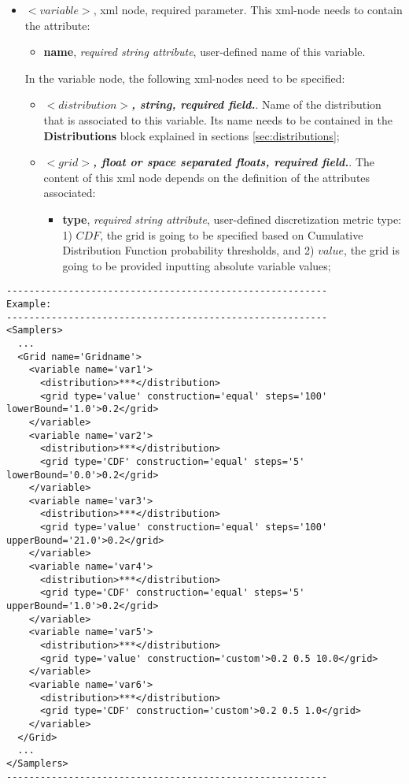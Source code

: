\begin{itemize}
\item $<variable>$, xml node, required parameter. This xml-node needs to contain the attribute:
\begin{itemize}
  \item \textbf{name}, \textit{required string attribute}, user-defined name of this variable. 
 \end{itemize}
 In the variable node, the following xml-nodes need to be specified:
 \begin{itemize}
    \item $<distribution>$\textbf{\textit{, string, required field.}}. Name of the distribution that is associated to this variable. Its name needs to be contained in the \textbf{Distributions} block explained in sections \ref{sec:distributions};
    \item $<grid>$\textbf{\textit{, float or space separated floats, required field.}}. The content of this xml node depends on the definition of the attributes associated:
\vspace{-5mm}
\begin{itemize}
\itemsep0em
\item \textbf{type}, \textit{required string attribute}, user-defined discretization metric type: 1) $CDF$, the grid is going to be specified based on  Cumulative Distribution Function probability thresholds, and 2) $value$, the grid is going to be provided inputting absolute variable values;

\end{itemize}
\vspace{-5mm}
  \end{itemize}
\end{itemize}

\begin{lstlisting}[style=XML]
---------------------------------------------------------
Example:
---------------------------------------------------------
<Samplers>
  ...
  <Grid name='Gridname'> 
    <variable name='var1'> 
      <distribution>***</distribution>
      <grid	type='value' construction='equal' steps='100' lowerBound='1.0'>0.2</grid>	
    </variable> 
    <variable name='var2'> 
      <distribution>***</distribution>
      <grid	type='CDF' construction='equal' steps='5' lowerBound='0.0'>0.2</grid>	
    </variable>
    <variable name='var3'> 
      <distribution>***</distribution>
      <grid	type='value' construction='equal' steps='100' upperBound='21.0'>0.2</grid>	
    </variable> 
    <variable name='var4'> 
      <distribution>***</distribution>
      <grid	type='CDF' construction='equal' steps='5' upperBound='1.0'>0.2</grid>	
    </variable>
    <variable name='var5'> 
      <distribution>***</distribution>
      <grid	type='value' construction='custom'>0.2 0.5 10.0</grid>	
    </variable> 
    <variable name='var6'> 
      <distribution>***</distribution>
      <grid	type='CDF' construction='custom'>0.2 0.5 1.0</grid>	
    </variable>
  </Grid>
  ...
</Samplers>
---------------------------------------------------------
\end{lstlisting}
 

